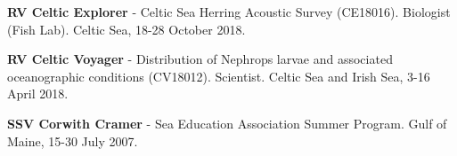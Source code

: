 \documentclass[a4paper]{deedy-resume} %
\begin{document}
\begin{flushleft}
\begin{tightitemize}
\item \textbf{RV Celtic Explorer} - Celtic Sea Herring Acoustic Survey (CE18016). Biologist (Fish Lab). Celtic Sea, 18-28 October 2018. 
\item \textbf{RV Celtic Voyager} - Distribution of Nephrops larvae and associated oceanographic conditions (CV18012). Scientist. Celtic Sea and Irish Sea, 3-16 April 2018.
\item \textbf{SSV Corwith Cramer} - Sea Education Association Summer Program. Gulf of Maine, 15-30 July 2007.
\end{tightitemize}

\sectionspace %

\end{flushleft}
\end{document}

